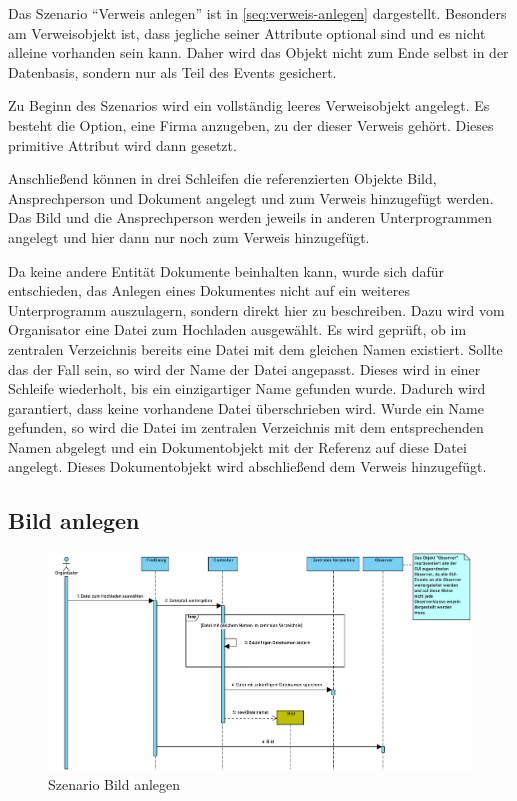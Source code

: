 \FloatBarrier

Das Szenario \enquote{Verweis anlegen} ist in \autoref{seq:verweis-anlegen} dargestellt. Besonders am Verweisobjekt ist, dass jegliche seiner Attribute optional sind und es nicht alleine vorhanden sein kann. Daher wird das Objekt nicht zum Ende selbst in der Datenbasis, sondern nur als Teil des Events gesichert.

Zu Beginn des Szenarios wird ein vollständig leeres Verweisobjekt angelegt. Es besteht die Option, eine Firma anzugeben, zu der dieser Verweis gehört. Dieses primitive Attribut wird dann gesetzt.

Anschließend können in drei Schleifen die referenzierten Objekte Bild, Ansprechperson und Dokument angelegt und zum Verweis hinzugefügt werden. Das Bild und die Ansprechperson werden jeweils in anderen Unterprogrammen angelegt und hier dann nur noch zum Verweis hinzugefügt.

Da keine andere Entität Dokumente beinhalten kann, wurde sich dafür entschieden, das Anlegen eines Dokumentes nicht auf ein weiteres Unterprogramm auszulagern, sondern direkt hier zu beschreiben. Dazu wird vom Organisator eine Datei zum Hochladen ausgewählt. Es wird geprüft, ob im zentralen Verzeichnis bereits eine Datei mit dem gleichen Namen existiert. Sollte das der Fall sein, so wird der Name der Datei angepasst. Dieses wird in einer Schleife wiederholt, bis ein einzigartiger Name gefunden wurde. Dadurch wird garantiert, dass keine vorhandene Datei überschrieben wird. Wurde ein Name gefunden, so wird die Datei im zentralen Verzeichnis mit dem entsprechenden Namen abgelegt und ein Dokumentobjekt mit der Referenz auf diese Datei angelegt. Dieses Dokumentobjekt wird abschließend dem Verweis hinzugefügt.

\FloatBarrier
\newpage

\subsection{Bild anlegen}

\begin{figure}[ht!]
    \centering
    \includegraphics[width=0.98\columnwidth]{Bilder/seq_Bild_anlegen.pdf}
    \caption{Szenario Bild anlegen}
    \label{seq:bild-anlegen}
\end{figure}

